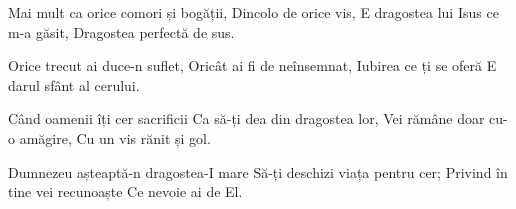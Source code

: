 \beginverse
Mai mult ca orice comori și bogății,
Dincolo de orice vis,
E dragostea lui Isus ce m-a găsit,
Dragostea perfectă de sus.
\endverse

\beginverse
Orice trecut ai duce-n suflet,
Oricât ai fi de neînsemnat,
Iubirea ce ți se oferă
E darul sfânt al cerului.
\endverse

\beginverse
Când oamenii îți cer sacrificii
Ca să-ți dea din dragostea lor,
Vei rămâne doar cu-o amăgire,
Cu un vis rănit și gol.
\endverse

\beginchorus
Dumnezeu așteaptă-n dragostea-I mare
Să-ți deschizi viața pentru cer;
Privind în tine vei recunoaște
Ce nevoie ai de El.
\endchorus
\endsong